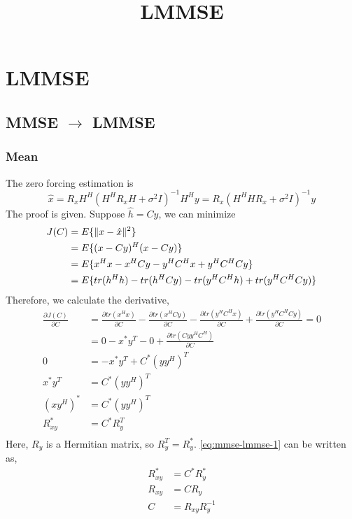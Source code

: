 \documentclass{article}
\title{LMMSE}
\author{}
\date{}
\DeclarePairedDelimiter{\norm}{\lVert}{\rVert}
\begin{document}
\maketitle
\section{LMMSE}
\subsection{MMSE $\to$ LMMSE}
\subsubsection{Mean}
The zero forcing estimation is
\begin{equation}
\hat{x} = R_xH^H(H^HR_xH + \sigma^2I)^{-1}H^Hy = R_x(H^HHR_x + \sigma^2I)^{-1}y
\end{equation}
The proof is given. Suppose $\hat{h}=Cy$, we can minimize
\begin{equation}
\begin{split}
J(C) &= E\{\norm{x - \hat{x}}^2 \} \\
&= E\{(x-Cy)^H(x-Cy)\} \\
&= E\{x^Hx - x^HCy - y^HC^Hx + y^HC^HCy \} \\
&= E\{tr(h^Hh) - tr(h^HCy) - tr(y^HC^Hh) + tr(y^HC^HCy) \} \\
\end{split}
\end{equation}
Therefore, we calculate the derivative,
\begin{equation}
\begin{split}
\frac{\partial J(C)}{\partial C} &= \frac{\partial tr(x^Hx)}{\partial C} - \frac{\partial tr(x^HCy)}{\partial C} - \frac{\partial tr(y^HC^Hx)}{\partial C} + \frac{\partial tr(y^HC^HCy)}{\partial C } = 0\\
&= 0 - x^*y^T - 0 + \frac{\partial tr(Cyy^HC^H)}{\partial C } \\
0 &= -x^*y^T + C^*(yy^H)^T \\
x^*y^T &= C^*(yy^H)^T \\
(xy^H)^* &= C^*(yy^H)^T \\
R_{xy}^* &= C^*R_{y}^T \\
\end{split}
\label{eq:mmse-lmmse-1}
\end{equation}
Here, $R_{y}$ is a Hermitian matrix, so $R_{y}^T = R_{y}^*$. \eqref{eq:mmse-lmmse-1} can be written as,
\begin{equation}
\begin{split}
R_{xy}^* &= C^*R_{y}^* \\
R_{xy} &= CR_{y} \\
C &= R_{xy}R_{y}^{-1} \\
\end{split}
\label{eq:mmse-lmmse-2}
\end{equation}
\end{document}
